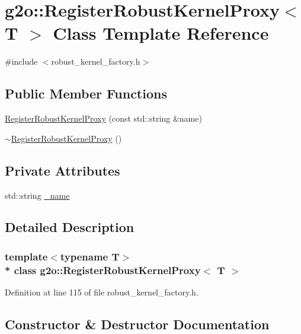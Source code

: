 \hypertarget{classg2o_1_1RegisterRobustKernelProxy}{}\section{g2o\+:\+:Register\+Robust\+Kernel\+Proxy$<$ T $>$ Class Template Reference}
\label{classg2o_1_1RegisterRobustKernelProxy}


{\ttfamily \#include $<$robust\+\_\+kernel\+\_\+factory.\+h$>$}

\subsection*{Public Member Functions}
\begin{DoxyCompactItemize}
\item 
\hyperlink{classg2o_1_1RegisterRobustKernelProxy_a9eb5309c892d96d5cc5b3d7a15670818}{Register\+Robust\+Kernel\+Proxy} (const std\+::string \&name)
\item 
\hyperlink{classg2o_1_1RegisterRobustKernelProxy_a01e3078be667d1faaf2046da6c219eb7}{$\sim$\+Register\+Robust\+Kernel\+Proxy} ()
\end{DoxyCompactItemize}
\subsection*{Private Attributes}
\begin{DoxyCompactItemize}
\item 
std\+::string \hyperlink{classg2o_1_1RegisterRobustKernelProxy_af88f8066f09024c0a94c90d1b99bf1c4}{\+\_\+name}
\end{DoxyCompactItemize}


\subsection{Detailed Description}
\subsubsection*{template$<$typename T$>$\\*
class g2o\+::\+Register\+Robust\+Kernel\+Proxy$<$ T $>$}



Definition at line 115 of file robust\+\_\+kernel\+\_\+factory.\+h.



\subsection{Constructor \& Destructor Documentation}
